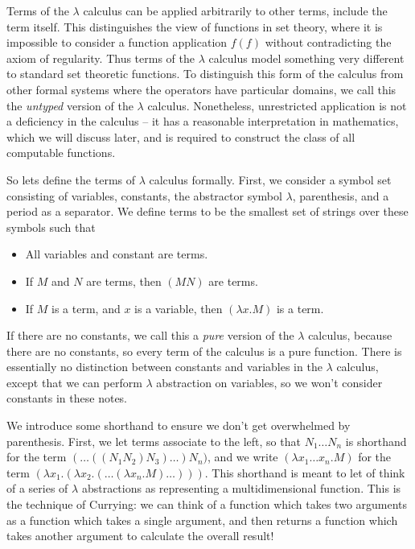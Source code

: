Terms of the $\lambda$ calculus can be applied arbitrarily to other terms, include the term itself. This distinguishes the view of functions in set theory, where it is impossible to consider a function application $f(f)$ without contradicting the axiom of regularity. Thus terms of the $\lambda$ calculus model something very different to standard set theoretic functions. To distinguish this form of the calculus from other formal systems where the operators have particular domains, we call this the \emph{untyped} version of the $\lambda$ calculus. Nonetheless, unrestricted application is not a deficiency in the calculus -- it has a reasonable interpretation in mathematics, which we will discuss later, and is required to construct the class of all computable functions.

So lets define the terms of $\lambda$ calculus formally. First, we consider a symbol set consisting of variables, constants, the abstractor symbol $\lambda$, parenthesis, and a period as a separator. We define terms to be the smallest set of strings over these symbols such that
%
\begin{itemize}
    \item All variables and constant are terms.
    \item If $M$ and $N$ are terms, then $(MN)$ are terms.
    \item If $M$ is a term, and $x$ is a variable, then $(\lambda x.M)$ is a term.
\end{itemize}
%
If there are no constants, we call this a \emph{pure} version of the $\lambda$ calculus, because there are no constants, so every term of the calculus is a pure function. There is essentially no distinction between constants and variables in the $\lambda$ calculus, except that we can perform $\lambda$ abstraction on variables, so we won't consider constants in these notes.

We introduce some shorthand to ensure we don't get overwhelmed by parenthesis. First, we let terms associate to the left, so that $N_1 \dots N_n$ is shorthand for the term $( \dots ((N_1 N_2) N_3) \dots ) N_n)$, and we write $(\lambda x_1 \dots x_n.M)$ for the term $(\lambda x_1.(\lambda x_2.(\dots(\lambda x_n.M)\dots)))$. This shorthand is meant to let of think of a series of $\lambda$ abstractions as representing a multidimensional function. This is the technique of Currying: we can think of a function which takes two arguments as a function which takes a single argument, and then returns a function which takes another argument to calculate the overall result!

